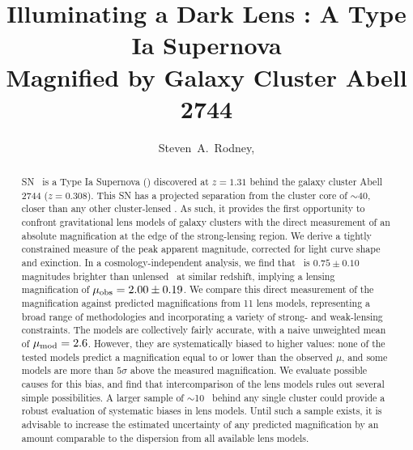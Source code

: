 







\title{Illuminating a Dark Lens : A Type Ia Supernova \\ Magnified by Galaxy Cluster Abell 2744}

\author{
 Steven~A.~Rodney,
  \etal
}



\begin{abstract}
SN \tomas\ is a Type Ia Supernova (\SNIa) discovered at $z=1.31$
behind the galaxy cluster Abell 2744 ($z=0.308$). This SN has a
projected separation from the cluster core of $\sim$40\arcsec, closer
than any other cluster-lensed \SNIa.  As such, it provides the first
opportunity to confront gravitational lens models of galaxy clusters
with the direct measurement of an absolute magnification at the edge
of the strong-lensing region.  We derive a tightly constrained measure
of the peak apparent magnitude, corrected for light curve shape and
exinction.  In a cosmology-independent analysis, we find that \tomas\
is $0.75\pm0.10$ magnitudes brighter than unlensed \SNeIa\ at similar
redshift, implying a lensing magnification of $\mu_{\rm
obs}=2.00\pm0.19$.  We compare this direct measurement of the
magnification against predicted magnifications from 11 lens models,
representing a broad range of methodologies and incorporating a
variety of strong- and weak-lensing constraints.  The models are
collectively fairly accurate, with a naive unweighted mean of
$\mu_{\rm mod}=2.6$.  However, they are systematically biased to
higher values: none of the tested models predict a magnification equal
to or lower than the observed $\mu$, and some models are more than
$5\sigma$ above the measured magnification.  We evaluate possible
causes for this bias, and find that intercomparison of the lens models
rules out several simple possibilities.  A larger sample of
$\sim$10 \SNeIa\ behind any single cluster could provide a robust
evaluation of systematic biases in lens models.  Until such a sample
exists, it is advisable to increase the estimated uncertainty of any
predicted magnification by an amount comparable to the dispersion from
all available lens models.
\end{abstract}

